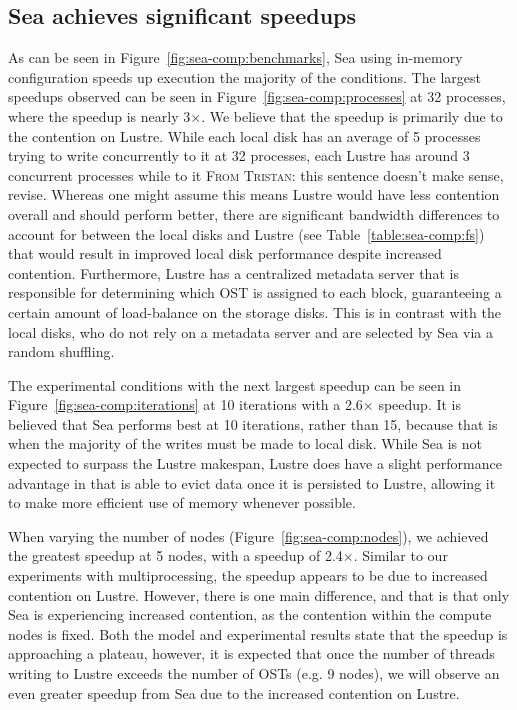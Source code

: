 \documentclass[10pt,journal,compsoc]{IEEEtran}
\newcommand{\TG}[1]{\color{red}\textsc{From Tristan}: #1\xspace\color{black}}
\begin{document}
      \subsection{Sea achieves significant speedups}

      As can be seen in Figure~\ref{fig:sea-comp:benchmarks}, Sea using
      in-memory configuration speeds up execution the majority of the
      conditions. The largest speedups observed can be seen in
      Figure~\ref{fig:sea-comp:processes} at 32 processes, where the speedup is
      nearly 3$\times$. We believe that the speedup is primarily due to the
      contention on Lustre. While each local disk has an average of 5 processes
      trying to write concurrently to it at 32 processes, each Lustre has around
      3 concurrent processes while to it \TG{this sentence doesn't make sense, revise}. Whereas one might assume this means
      Lustre would have less contention overall and should perform better, there
      are significant bandwidth differences to account for between the local
      disks and Lustre (see Table~\ref{table:sea-comp:fs}) that would result in
      improved local disk performance despite increased contention. Furthermore,
      Lustre has a centralized metadata server that is responsible for
      determining which OST is assigned to each block, guaranteeing a certain
      amount of load-balance on the storage disks. This is in contrast with the
      local disks, who do not rely on a metadata server and are selected by Sea
      via a random shuffling.

      The experimental conditions with the next largest speedup can be seen in
      Figure~\ref{fig:sea-comp:iterations} at 10 iterations with a 2.6$\times$
      speedup. It is believed that Sea performs best at 10 iterations, rather
      than 15, because that is when the majority of the writes must be made to
      local disk. While Sea is not expected to surpass the Lustre makespan,
      Lustre does have a slight performance advantage in that is able to evict
      data once it is persisted to Lustre, allowing it to make more efficient
      use of memory whenever possible. 

      When varying the number of nodes (Figure~\ref{fig:sea-comp:nodes}), we
      achieved the greatest speedup at 5 nodes, with a speedup of 2.4$\times$.
      Similar to our experiments with multiprocessing, the speedup appears
      to be due to increased contention on Lustre. However, there is one main
      difference, and that is that only Sea is experiencing increased
      contention, as the contention within the compute nodes is fixed. Both the
      model and experimental results state that the speedup is approaching a
      plateau, however, it is expected that once the number of threads writing
      to Lustre exceeds the number of OSTs (e.g. 9 nodes), we will observe an
      even greater speedup from Sea due to the increased contention on Lustre.
\end{document}
